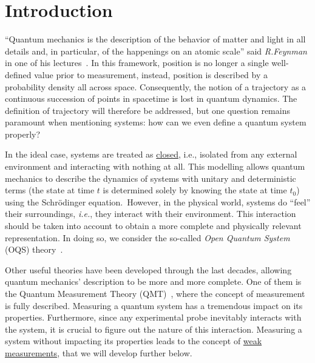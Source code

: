 \normalsize\justifying
\setlength{\parskip}{2mm}
\setcounter{page}{1}
\section*{\Huge Introduction}

``Quantum mechanics is the description of the behavior of matter and light in all details and, in particular, of the happenings on an atomic scale'' said \textit{R.Feynman} in one of his lectures~\cite{Feynman}. In this framework, position is no longer a single well-defined value prior to measurement, instead, position is described by a probability density all across space. Consequently, the notion of a trajectory as a continuous succession of points in spacetime is lost in quantum dynamics. The definition of trajectory will therefore be addressed, but one question remains paramount when mentioning systems: how can we even define a quantum system properly?\par

In the ideal case, systems are treated as \underline{closed}, i.e., isolated from any external environment and interacting with nothing at all. This modelling allows quantum mechanics to describe the dynamics of systems with unitary and deterministic terms (the state at time $t$ is determined solely by knowing the state at time $t_0$) using the Schrödinger equation.~\cite{CT}However, in the physical world, systems do ``feel'' their surroundings, \textit{i.e.}, they interact with their environment. This interaction should be taken into account to obtain a more complete and physically relevant representation. In doing so, we consider the so-called \textit{Open Quantum System} (OQS) theory~\cite{Breuer}.\par 

Other useful theories have been developed through the last decades, allowing quantum mechanics' description to be more and more complete. One of them is the Quantum Measurement Theory (QMT)~\cite{Jacobs}, where the concept of measurement is fully described. Measuring a quantum system has a tremendous impact on its properties. Furthermore, since any experimental probe inevitably interacts with the system, it is crucial to figure out the nature of this interaction. Measuring a system without impacting its properties leads to the concept of \underline{weak measurements}, that we will develop further below.\par


